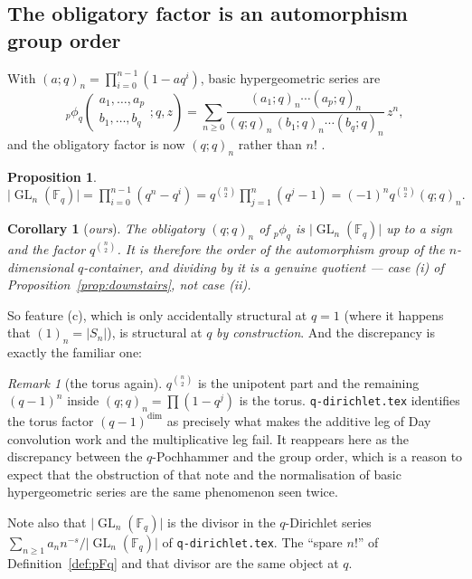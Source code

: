 \documentclass[11pt,a4paper]{article}
\newtheorem{proposition}[theorem]{Proposition}
\newtheorem{corollary}[theorem]{Corollary}
\theoremstyle{definition}
\theoremstyle{remark}
\newtheorem{remark}[theorem]{Remark}
\newcommand{\FF}{\mathbb{F}}
\newcommand{\norm}[1]{\lvert #1 \rvert}
\DeclareMathOperator{\GL}{GL}
\begin{document}
\subsection{The obligatory factor is an automorphism group order}

With $(a;q)_n = \prod_{i=0}^{n-1}(1 - aq^i)$, basic hypergeometric series are
\[
  {}_p\phi_{q}\!\left(\begin{matrix}a_1,\dots,a_p\\ b_1,\dots,b_q\end{matrix};q,z\right)
  = \sum_{n\ge0}
  \frac{(a_1;q)_n\cdots(a_p;q)_n}{(q;q)_n\,(b_1;q)_n\cdots(b_q;q)_n}\,z^n ,
\]
and the obligatory factor is now $(q;q)_n$ rather than $n!$ \cite{GasperRahman}.

\begin{proposition}\label{prop:qpoch-GL}
$\displaystyle \norm{\GL_n(\FF_q)} = \prod_{i=0}^{n-1}(q^n - q^i)
 = q^{\binom{n}{2}}\prod_{j=1}^{n}(q^j-1)
 = (-1)^n q^{\binom{n}{2}}(q;q)_n .$
\end{proposition}

\begin{corollary}[\emph{ours}]\label{cor:qhonest}
The obligatory $(q;q)_n$ of ${}_p\phi_q$ is $\norm{\GL_n(\FF_q)}$ up to a sign and the
factor $q^{\binom{n}{2}}$. It is therefore the order of the automorphism group of the
$n$-dimensional $q$-container, and dividing by it is a genuine quotient --- case (i)
of Proposition~\ref{prop:downstairs}, not case (ii).
\end{corollary}

So feature (c), which is only accidentally structural at $q = 1$ (where it happens
that $(1)_n = \norm{S_n}$), is structural at $q$ \emph{by construction}. And the
discrepancy is exactly the familiar one:

\begin{remark}[the torus again]\label{rem:torus}
$q^{\binom{n}{2}}$ is the unipotent part and the remaining $(q-1)^n$ inside
$(q;q)_n = \prod(1-q^j)$ is the torus. \texttt{q-dirichlet.tex} identifies the torus
factor $(q-1)^{\dim}$ as precisely what makes the additive leg of Day convolution work
and the multiplicative leg fail. It reappears here as the discrepancy between the
$q$-Pochhammer and the group order, which is a reason to expect that the obstruction
of that note and the normalisation of basic hypergeometric series are the same
phenomenon seen twice.
\end{remark}

\noindent
Note also that $\norm{\GL_n(\FF_q)}$ is the divisor in the $q$-Dirichlet series
$\sum_{n\ge1}a_n n^{-s}/\norm{\GL_n(\FF_q)}$ of \texttt{q-dirichlet.tex}. The
``spare $n!$'' of Definition~\ref{def:pFq} and that divisor are the same object at
$q$.
\end{document}
